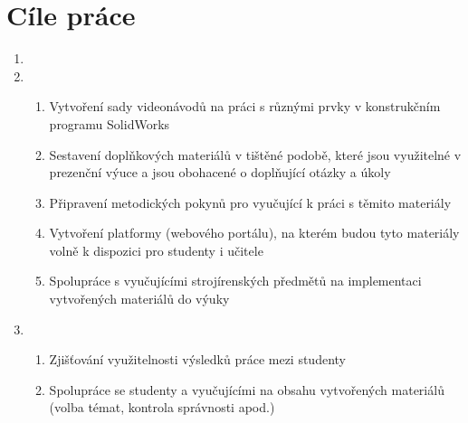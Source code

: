 \chapter{Cíle práce}

\begin{enumerate}[topsep=0pt]
    \setlength\itemsep{0em}
    \item {}
    
    \item {}
    \begin{enumerate}[topsep=0pt]
        \setlength\itemsep{0em}
        \item Vytvoření sady videonávodů na práci s různými prvky v konstrukčním programu SolidWorks
        \item Sestavení doplňkových materiálů v tištěné podobě, které jsou využitelné v prezenční výuce a jsou obohacené o doplňující otázky a úkoly
        \item Připravení metodických pokynů pro vyučující k práci s těmito materiály
        \item Vytvoření platformy (webového portálu), na kterém budou tyto materiály volně k dispozici pro studenty i učitele
        \item Spolupráce s vyučujícími strojírenských předmětů na implementaci vytvořených materiálů do výuky
    \end{enumerate}

    \item {}
    \begin{enumerate}[topsep=0pt]
        \setlength\itemsep{0em}
        \item Zjišťování využitelnosti výsledků práce mezi studenty 
        \item Spolupráce se studenty a vyučujícími na obsahu vytvořených materiálů (volba témat, kontrola správnosti apod.) 
    \end{enumerate}
\end{enumerate}
